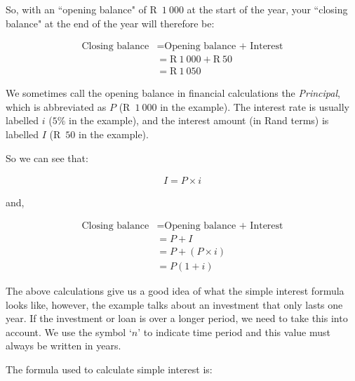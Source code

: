 So, with an ``opening balance" of R~$1~000$ at the start of the year, your ``closing balance" at the end of the year will therefore be:\par 
\begin{align*}
    \mbox{Closing balance} &= \mbox{Opening balance + Interest}\\
    &= \text{R}~1~000 + \text{R}~50\\
    &= \text{R}~1~050
\end{align*}

We sometimes call the opening balance in financial calculations the \textsl{Principal}, which is abbreviated as $P$ (R~$1~000$ in the example). The interest rate is usually labelled $i$ ($5\%$ in the example), and the interest amount (in Rand terms) is labelled $I$ (R~$50$ in the example).\par 

So we can see that:
        
\begin{align*}
    I = P \times i
\end{align*}

and,

\begin{align*}
    \mbox{Closing balance} &= \mbox{Opening balance + Interest} \nonumber\\
    &= P + I \nonumber\\
    &= P + (P \times i)\nonumber\\
    &= P(1 + i)
\end{align*}



The above calculations give us a good idea of what the simple interest formula looks like, however, the example talks
about an investment that only lasts one year. If the investment or loan is over a longer period, we need to take this
into account. We use the symbol ‘$n$’ to indicate time period and this value must always be written in years.\par

The formula used to calculate simple interest is:





